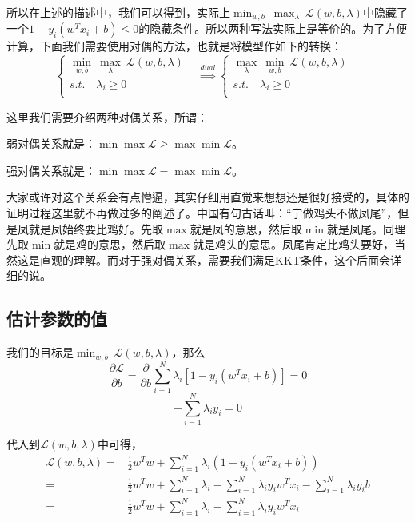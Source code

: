 \documentclass[a4paper]{article}
\begin{document}
所以在上述的描述中，我们可以得到，实际上$\min_{w,b} \ \max_\lambda \ \mathcal{L}(w,b,\lambda)$中隐藏了一个$1-y_i(w^Tx_i+b)\leq 0$的隐藏条件。所以两种写法实际上是等价的。为了方便计算，下面我们需要使用对偶的方法，也就是将模型作如下的转换：
\begin{equation}
    \left\{
    \begin{array}{ll}
          \min_{w,b} \ \max_\lambda \ \mathcal{L}(w,b,\lambda) & \\
          s.t.\quad \lambda_i \geq 0 & \\
    \end{array}
    \right.
    \stackrel{dual}{\Longrightarrow}
    \left\{
    \begin{array}{ll}
          \max_\lambda \ \min_{w,b} \ \mathcal{L}(w,b,\lambda) & \\
          s.t.\quad \lambda_i \geq 0 & \\
    \end{array}
    \right.
\end{equation}

这里我们需要介绍两种对偶关系，所谓：

弱对偶关系就是：$\min\max\mathcal{L} \geq \max\min\mathcal{L}$。

强对偶关系就是：$\min\max\mathcal{L} = \max\min\mathcal{L}$。

大家或许对这个关系会有点懵逼，其实仔细用直觉来想想还是很好接受的，具体的证明过程这里就不再做过多的阐述了。中国有句古话叫：“宁做鸡头不做凤尾”，但是凤就是凤始终要比鸡好。先取$\max$就是凤的意思，然后取$\min$就是凤尾。同理先取$\min$就是鸡的意思，然后取$\max$就是鸡头的意思。凤尾肯定比鸡头要好，当然这是直观的理解。而对于强对偶关系，需要我们满足KKT条件，这个后面会详细的说。

\subsection{估计参数的值}
我们的目标是$\min_{w,b} \ \mathcal{L}(w,b,\lambda)$，那么
\begin{equation}
    \frac{\partial \mathcal{L}}{\partial b} = \frac{\partial}{\partial b}\sum_{i=1}^N
    \lambda_i[1-y_i(w^Tx_i+b)] = 0
\end{equation}
\begin{equation}
    -\sum_{i=1}^N \lambda_iy_i = 0
\end{equation}

代入到$\mathcal{L}(w,b,\lambda)$中可得，
\begin{align}
    \mathcal{L}(w,b,\lambda) = & \frac{1}{2}w^Tw + \sum_{i=1}^N\lambda_i(1-y_i(w^Tx_i+b)) \\
    = & \frac{1}{2}w^Tw + \sum_{i=1}^N\lambda_i - \sum_{i=1}^N\lambda_iy_iw^Tx_i - \sum_{i=1}^N\lambda_iy_ib \\
    = & \frac{1}{2}w^Tw + \sum_{i=1}^N\lambda_i - \sum_{i=1}^N\lambda_iy_iw^Tx_i
\end{align}
\end{document}
